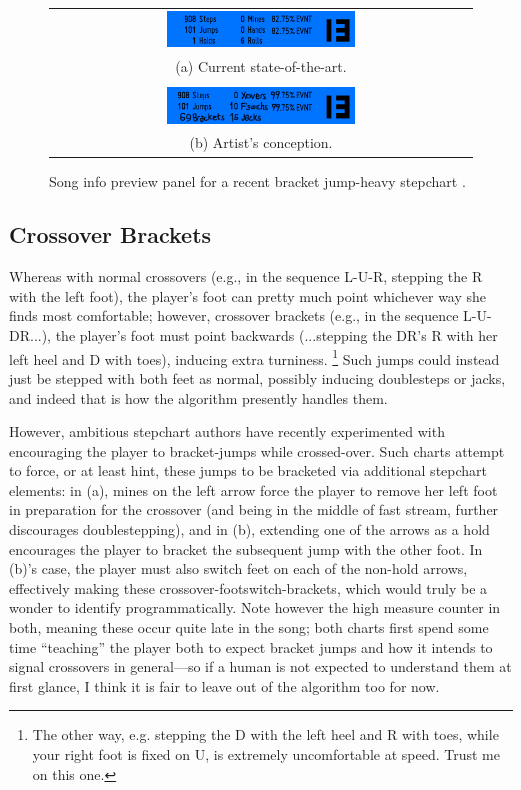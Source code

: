 \documentclass[10pt]{sigplanconf}
\begin{document}
\begin{figure}[t]
	\begin{tabular}{c}
	\includegraphics[width=0.46\textwidth]{song-info.png} \\
		(a) Current state-of-the-art.
		\\
		\\
	\includegraphics[width=0.46\textwidth]{song-info-better.png} \\
		(b) Artist's conception.
	\end{tabular}
	\caption{Song info preview panel for a recent bracket jump-heavy stepchart \cite{divine}.}
	\label{fig:songpreview}
\end{figure}

\subsection{Crossover Brackets}
\label{sec:xover-brackers}

Whereas with normal crossovers (e.g., in the sequence L-U-R, stepping the R with the left foot),
the player's foot can pretty much point whichever way she finds most comfortable;
however,
crossover brackets (e.g., in the sequence L-U-DR...),
the player's foot must point backwards (...stepping the DR's R with her left heel and D with toes),
inducing extra turniness.%
\footnote{The other way, e.g. stepping the D with the left heel and R with toes, while your right foot is fixed on U, is extremely uncomfortable at speed. Trust me on this one.}
Such jumps could instead just be stepped with both feet as normal,
possibly inducing doublesteps or jacks,
and indeed that is how the algorithm presently handles them.

However, ambitious stepchart authors have recently experimented with encouraging the player to bracket-jumps while crossed-over.
Such charts attempt to force, or at least hint, these jumps to be bracketed
via additional stepchart elements: in (a), mines on the left arrow force the player to remove her left foot in preparation for the crossover (and being in the middle of fast stream, further discourages doublestepping),
and in (b), extending one of the arrows as a hold encourages the player to bracket the subsequent jump with the other foot.
In (b)'s case, the player must also switch feet on each of the non-hold arrows,
effectively making these crossover-footswitch-brackets,
which would truly be a wonder to identify programmatically.
Note however the high measure counter in both, meaning these occur quite late in the song;
both charts first spend some time ``teaching'' the player both to expect bracket jumps
and how it intends to signal crossovers in general---so if a human is not expected to understand them at first glance,
I think it is fair to leave out of the algorithm too for now.
\end{document}
